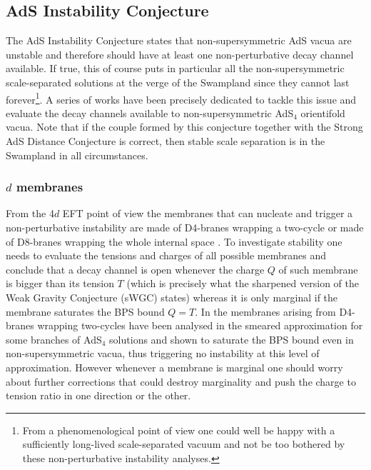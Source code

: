 \documentclass[11pt, a4paper]{article}
\renewcommand{\bm}{\boldmath}
\begin{document}
\subsection{AdS Instability Conjecture}
\label{sec:unstab}

The AdS Instability Conjecture \cite{Ooguri:2016pdq,Freivogel:2016qwc} states that non-supersymmetric AdS vacua are unstable and therefore should have at least one non-perturbative decay channel available. If true, this of course puts in particular all the non-supersymmetric scale-separated solutions at the verge of the Swampland since they cannot last forever\footnote{From a phenomenological point of view one could well be happy with a sufficiently long-lived scale-separated vacuum and not be too bothered by these non-perturbative instability analyses.}. A series of works have been precisely dedicated to tackle this issue and evaluate the decay channels available to non-supersymmetric AdS$_4$ orientifold vacua. Note that if the couple formed by this conjecture together with the Strong AdS Distance Conjecture is correct, then stable scale separation is in the Swampland in all circumstances.

\subsubsection[4$d$ membranes]{\bm 4$d$ membranes}

From the 4$d$ EFT point of view the membranes that can nucleate and trigger a non-perturbative instability are made of D4-branes wrapping a two-cycle or made of D8-branes wrapping the whole internal space \cite{Lanza:2019xxg,Lanza:2020qmt}. To investigate stability one needs to evaluate the tensions and charges of all possible membranes and conclude that a decay channel is open whenever the charge $Q$ of such membrane is bigger than its tension $T$ (which is precisely what the sharpened version of the Weak Gravity Conjecture (sWGC) \cite{Ooguri:2016pdq} states) whereas it is only marginal if the membrane saturates the BPS bound $Q=T$. In \cite{Narayan:2010em} the membranes arising from D4-branes wrapping two-cycles have been analysed in the smeared approximation for some branches of AdS$_4$ solutions and shown to saturate the BPS bound even in non-supersymmetric vacua, thus triggering no instability at this level of approximation. However whenever a membrane is marginal one should worry about further corrections that could destroy marginality and push the charge to tension ratio in one direction or the other.
\end{document}
